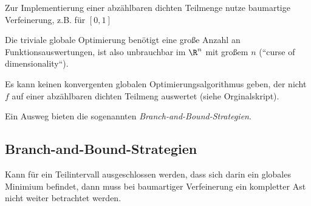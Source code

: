 Zur Implementierung einer abzählbaren dichten Teilmenge nutze baumartige Verfeinerung, z.B. für $[0,1]$

Die triviale globale Optimierung benötigt eine große Anzahl an Funktionsauswertungen, ist also unbrauchbar im $\R^n$ mit großem $n$ (“curse of dimensionality“).

Es kann keinen konvergenten globalen Optimierungsalgorithmus geben, der nicht $f$ auf einer abzählbaren dichten Teilmeng auswertet (siehe Orginalskript).

Ein Ausweg bieten die sogenannten \emph{Branch-and-Bound-Strategien}.


\subsection{Branch-and-Bound-Strategien}


Kann für ein Teilintervall ausgeschlossen werden, dass sich darin ein globales Minimium befindet, dann muss bei baumartiger Verfeinerung ein kompletter Ast nicht weiter betrachtet werden.

